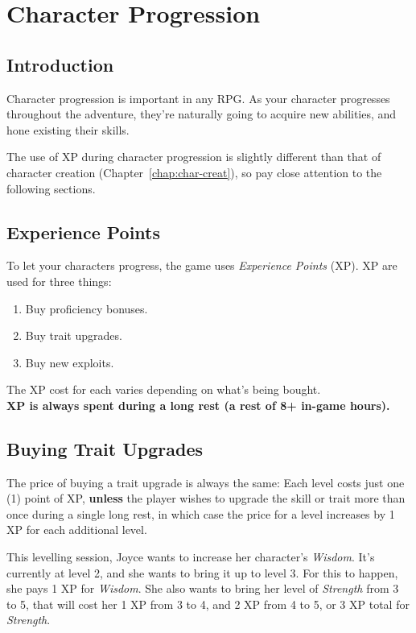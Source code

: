 \chapter{Character Progression}\label{chap:char-prog}
\section{Introduction}
Character progression is important in any RPG.
As your character progresses throughout the adventure, they're naturally going to acquire new abilities, and hone existing their skills.

\begin{note} 
  The use of XP during character progression is slightly different than that of character creation (Chapter~\ref{chap:char-creat}), so pay close attention to the following sections.
\end{note}

\section{Experience Points}
To let your characters progress, the game uses \textit{Experience Points} (XP).
XP are used for three things:
\begin{enumerate}
\item Buy proficiency bonuses.
\item Buy trait upgrades.
\item Buy new exploits.
\end{enumerate}
The XP cost for each varies depending on what's being bought.\\
\textbf{XP is always spent during a long rest (a rest of 8+ in-game hours).}

\section{Buying Trait Upgrades}
The price of buying a trait upgrade is always the same:
Each level costs just one (1) point of XP, \textbf{unless} the player wishes to upgrade the skill or trait more than once during a single long rest, in which case the price for a level increases by 1 XP for each additional level.

\begin{example}
This levelling session, Joyce wants to increase her character's \textit{Wisdom}. 
It's currently at level 2, and she wants to bring it up to level 3.
For this to happen, she pays 1 XP for \textit{Wisdom}.
She also wants to bring her level of \textit{Strength} from 3 to 5, that will cost her 1 XP from 3 to 4, and 2 XP from 4 to 5, or 3 XP total for \textit{Strength}.
\end{example}

